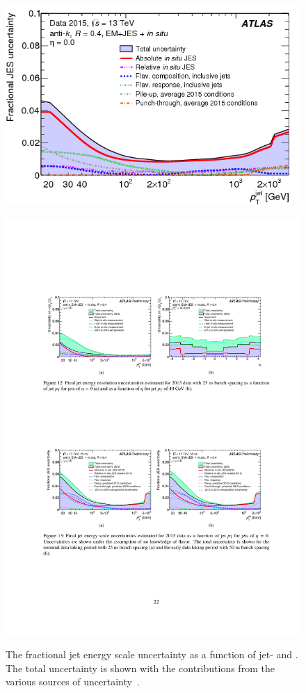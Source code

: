 \begin{figure}[!htb]
  \begin{center}
    \captionsetup[subfigure]{aboveskip=0pt,justification=centering}
     {\includegraphics[width=0.4\linewidth, angle=0]{figs/Objects/jets_uncert_JES_pt.png} }
  \end{center}
 \vspace{-1em}
  \caption[The fractional jet energy scale uncertainty as a function of jet-\pT{} and \eta.]
          { \label{fig:obj-jets_calib_JES} The fractional jet energy scale uncertainty as a function of jet-\pT{} and \eta.
            The total uncertainty is shown with the contributions from the various sources of uncertainty~\cite{obj-jets_calib_run2}.}
 \vspace{0.2em}
  \begin{center}      
    \captionsetup[subfigure]{aboveskip=0pt,justification=centering}
     {\includegraphics[width=0.4\linewidth, angle=0]{figs/Objects/jets_uncert_JER_pt.pdf} }

\end{center}
\end{figure}
